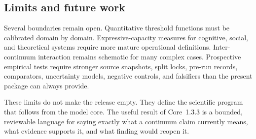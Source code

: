 \subsection{Limits and future work}

Several boundaries remain open. Quantitative threshold functions must be
calibrated domain by domain. Expressive-capacity measures for cognitive,
social, and theoretical systems require more mature operational definitions.
Inter-continuum interaction remains schematic for many complex cases.
Prospective empirical tests require stronger source snapshots, split locks,
pre-run records, comparators, uncertainty models, negative controls, and
falsifiers than the present package can always provide.

These limits do not make the release empty. They define the scientific program
that follows from the model core. The useful result of Core~1.3.3 is a bounded,
reviewable language for saying exactly what a continuum claim currently means,
what evidence supports it, and what finding would reopen it.
